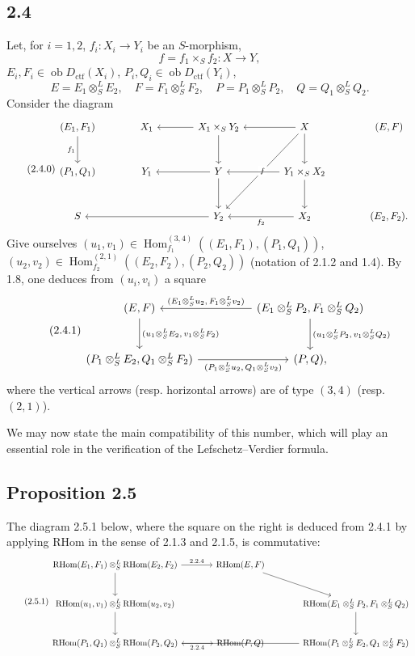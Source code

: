 \documentclass[11pt]{article}
\DeclareMathOperator{\Hom}{Hom}
\newcommand{\ob}{\operatorname{ob}}
\providecommand{\RHom}{\mathrm{RHom}}
\providecommand{\ctf}{\mathrm{ctf}}
\providecommand{\RHom}{\mathrm{RHom}}
\providecommand{\Hom}{\operatorname{Hom}}
\providecommand{\ob}{\operatorname{ob}}
\providecommand{\RHom}{\mathrm R\mathcal{H}om}
\providecommand{\RHom}{\mathrm{RHom}}
\begin{document}
\subsection*{2.4}
Let, for $i=1,2$, $f_i:X_i\to Y_i$ be an $S$-morphism,
\[
f=f_1\times_S f_2:X\to Y,
\]
$E_i,F_i\in\ob D_{\ctf}(X_i)$, $P_i,Q_i\in\ob D_{\ctf}(Y_i)$,
\[
E=E_1\otimes^{L}_{S}E_2,
\quad F=F_1\otimes^{L}_{S}F_2,
\quad P=P_1\otimes^{L}_{S}P_2,
\quad Q=Q_1\otimes^{L}_{S}Q_2.
\]
Consider the diagram
\begin{equation}\tag{2.4.0}
\begin{tikzcd}[column sep=large,row sep=large]
(E_1,F_1) \arrow[d,"f_1"'] & X_1 & X_1\times_SY_2 \arrow[l] \arrow[d] & X \arrow[l] \arrow[d] \arrow[ddl,"f" description] & (E,F)\\
(P_1,Q_1) & Y_1 & Y \arrow[l] \arrow[d] & Y_1\times_SX_2 \arrow[l] \arrow[d] \\
S & & Y_2 \arrow[ll] & X_2 \arrow[l,"f_2"] & (E_2,F_2).
\end{tikzcd}
\end{equation}
Give ourselves $(u_1,v_1)\in\Hom_{f_1}^{(3,4)}((E_1,F_1),(P_1,Q_1))$, $(u_2,v_2)\in\Hom_{f_2}^{(2,1)}((E_2,F_2),(P_2,Q_2))$ (notation of 2.1.2 and 1.4). By 1.8, one deduces from $(u_i,v_i)$ a square
\begin{equation}\tag{2.4.1}
\begin{tikzcd}[column sep=huge,row sep=large]
(E,F) \arrow[d,"{(u_1\otimes^L_S E_2,\,v_1\otimes^L_S F_2)}"] & (E_1\otimes^L_S P_2,F_1\otimes^L_S Q_2) \arrow[l,"{(E_1\otimes^L_S u_2,\,F_1\otimes^L_S v_2)}"'] \arrow[d,"{(u_1\otimes^L_S P_2,\,v_1\otimes^L_S Q_2)}"]\\
(P_1\otimes^L_S E_2,Q_1\otimes^L_S F_2) \arrow[r,"{(P_1\otimes^L_S u_2,\,Q_1\otimes^L_S v_2)}"'] & (P,Q),
\end{tikzcd}
\end{equation}
where the vertical arrows (resp. horizontal arrows) are of type $(3,4)$ (resp. $(2,1)$).

We may now state the main compatibility of this number, which will play an essential role in the verification of the Lefschetz--Verdier formula.

\subsection*{Proposition 2.5}
The diagram 2.5.1 below, where the square on the right is deduced from 2.4.1 by applying $\RHom$ in the sense of 2.1.3 and 2.1.5, is commutative:
\begin{equation}\tag{2.5.1}
\begin{tikzcd}[column sep=large,row sep=large]
\RHom(E_1,F_1)\otimes^L_S\RHom(E_2,F_2) \arrow[r,"2.2.4"] \arrow[d] & \RHom(E,F) \arrow[dr] \\
\RHom(u_1,v_1)\otimes^L_S\RHom(u_2,v_2) \arrow[d] & & \RHom(E_1\otimes^L_SP_2,F_1\otimes^L_SQ_2) \arrow[d]\\
\RHom(P_1,Q_1)\otimes^L_S\RHom(P_2,Q_2) \arrow[r,"2.2.4"'] & \RHom(P,Q) & \RHom(P_1\otimes^L_SE_2,Q_1\otimes^L_SF_2) \arrow[ll]
\end{tikzcd}
\end{equation}
\end{document}
